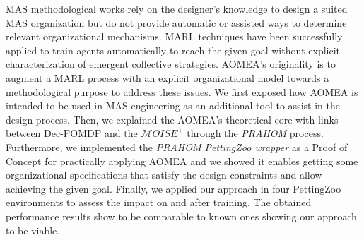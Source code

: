 \documentclass[runningheads]{llncs}
\begin{document}



MAS methodological works rely on the designer's knowledge to design a suited MAS organization but do not provide automatic or assisted ways to determine relevant organizational mechanisms.
MARL techniques have been successfully applied to train agents automatically to reach the given goal without explicit characterization of emergent collective strategies.
AOMEA's originality is to augment a MARL process with an explicit organizational model towards a methodological purpose to address these issues. We first exposed how AOMEA is intended to be used in MAS engineering as an additional tool to assist in the design process.
Then, we explained the AOMEA's theoretical core with links between Dec-POMDP and the $\mathcal{M}OISE^+$ through the \emph{PRAHOM} process.
Furthermore, we implemented the \emph{PRAHOM PettingZoo wrapper} as a Proof of Concept for practically applying AOMEA and we showed it enables getting some organizational specifications that satisfy the design constraints and allow achieving the given goal.
Finally, we applied our approach in four PettingZoo environments to assess the impact on and after training. The obtained performance results show to be comparable to known ones showing our approach to be viable.
\end{document}

